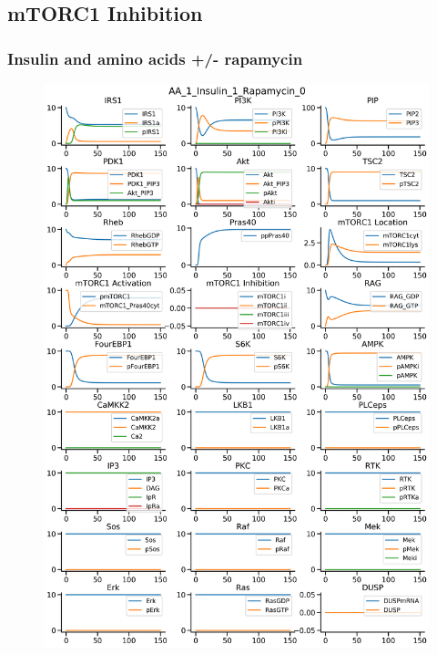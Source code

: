 \documentclass{beamer}
\begin{document}
\subsection{mTORC1 Inhibition} %
\begin{frame}
\frametitle{Insulin and amino acids +/- rapamycin}
\begin{figure}
    \begin{minipage}{0.45\textwidth}
        \centering
        \includegraphics[width=\textwidth]{../simulations/ExtendedPI3KModel/validations/AAWithInsulinWithRapamycin/AA_1_Insulin_1_Rapamycin_0-6.png}
    \end{minipage}
    \begin{minipage}{0.45\textwidth}

\end{minipage}
\end{figure}
\end{frame}
\end{document}
